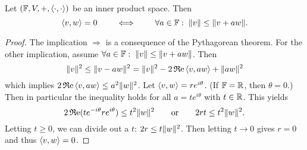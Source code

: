 \begin{lemma} \label{orthogonality}
Let $(\mathbb{F}, V,+,\left\langle \cdot,\cdot \right\rangle)$ be an inner product space. Then
\[ \left\langle v,w \right\rangle=0 \qquad \iff \qquad \forall a\in\mathbb{F}:\;\lVert v\rVert\leq\lVert v+aw\rVert.  \]
\end{lemma}
\begin{proof}
The implication $\Rightarrow$ is a consequence of the Pythagorean theorem. For the other implication, assume $\forall a\in\mathbb{F}:\;\lVert v\rVert\leq\lVert v+aw\rVert$. Then
\[ \lVert v\rVert^2 \leq \lVert v-aw\rVert^2 = \lVert v\rVert^2 - 2\operatorname{\mathfrak{R}e}\left\langle v,aw \right\rangle + \lVert aw\rVert^2 \]
which implies $2\operatorname{\mathfrak{R}e}\left\langle v,aw \right\rangle \leq a^2\lVert w\rVert^2$. Let $\left\langle v,w \right\rangle = re^{i\theta}$. (If $\mathbb{F} = \mathbb{R}$, then $\theta=0$.) Then in particular the inequality holds for all $a=te^{i\theta}$ with $t\in\mathbb{R}$. This yields
\[ 2\operatorname{\mathfrak{R}e}(te^{-i\theta}re^{i\theta}) \leq t^2\lVert w\rVert^2 \qquad \text{or}\qquad 2rt\leq t^2\lVert w\rVert^2. \]
Letting $t\geq 0$, we can divide out a $t$: $2r\leq t\lVert w\rVert^2$. Then letting $t\to 0$ gives $r=0$ and thus $\left\langle v,w \right\rangle=0$.
\end{proof}

